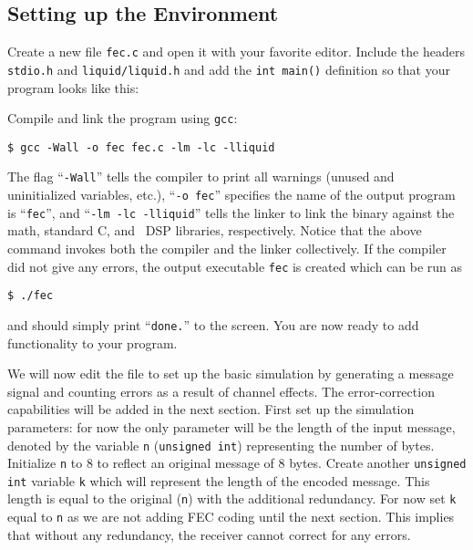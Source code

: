 \subsection{Setting up the Environment}
\label{tutorial:fec:environment}

Create a new file {\tt fec.c} and open it with your favorite editor.
Include the headers {\tt stdio.h} and {\tt liquid/liquid.h}
and add the {\tt int main()} definition
so that your program looks like this:
%

%
Compile and link the program using {\tt gcc}:
%
\begin{Verbatim}[fontsize=\small]
    $ gcc -Wall -o fec fec.c -lm -lc -lliquid
\end{Verbatim}
%
The flag ``{\tt -Wall}'' tells the compiler to print all warnings
(unused and uninitialized variables, etc.),
``{\tt -o fec}'' specifies the name of the output program is
``{\tt fec}'', and
``{\tt -lm -lc -lliquid}'' tells the linker to link the binary against
the math, standard C, and \liquid\ DSP libraries, respectively.
Notice that the above command invokes both the compiler and the linker
collectively.
%
If the compiler did not give any errors, the output executable {\tt fec}
is created which can be run as
%
\begin{Verbatim}[fontsize=\small]
    $ ./fec
\end{Verbatim}
%
and should simply print ``{\tt done.}'' to the screen.
You are now ready to add functionality to your program.

We will now edit the file to set up the basic simulation by generating a
message signal and counting errors as a result of channel effects.
The error-correction capabilities will be added in the next section.
First set up the simulation parameters: for now the only parameter will
be the length of the input message, denoted by the variable {\tt n}
({\tt unsigned int}) representing the number of bytes.
Initialize {\tt n} to 8 to reflect an original message of 8 bytes.
Create another {\tt unsigned int} variable {\tt k} which will represent
the length of the encoded message.
This length is equal to the original ({\tt n}) with the additional
redundancy.
For now set {\tt k} equal to {\tt n} as we are not adding FEC coding
until the next section.
This implies that without any redundancy, the receiver cannot correct
for any errors.

